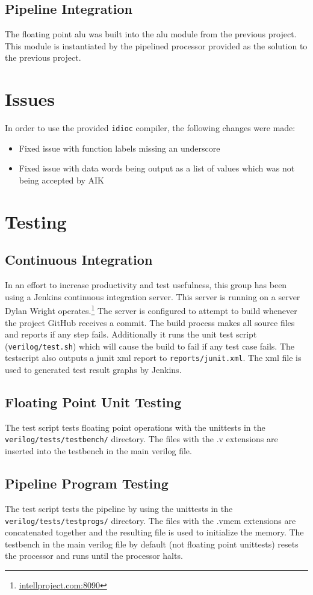 \documentclass[conference]{IEEEtran}
\begin{document}
\subsection{Pipeline Integration}
The floating point alu was built into the alu module from the previous project.
This module is instantiated by the pipelined processor provided as the 
solution to the previous project.\cite{a3-sol}

\section{Issues}
In order to use the provided \texttt{idioc} compiler, the following changes
were made:
\begin{itemize}
    \item Fixed issue with function labels missing an underscore
    \item Fixed issue with data words being output as a list of values which
        was not being accepted by AIK
\end{itemize}

\section{Testing}
\subsection{Continuous Integration}
In an effort to increase productivity and test usefulness, this group has
been using a Jenkins continuous integration server. This server is running
on a server Dylan Wright operates.\footnote{\url{intellproject.com:8090}} 
The server is configured to attempt to
build whenever the project GitHub receives a commit. The build process makes
all source files and reports if any step fails. Additionally it runs the
unit test script (\texttt{verilog/test.sh}) which will cause the build to fail
if any test case fails. The testscript also outputs a junit xml report to
\texttt{reports/junit.xml}. The xml file is used to generated test result
graphs by Jenkins. 

\subsection{Floating Point Unit Testing}
The test script tests floating point operations with the unittests in the
\texttt{verilog/tests/testbench/} directory. The files with the .v extensions
are inserted into the testbench in the main verilog file. 
\subsection{Pipeline Program Testing}
The test script tests the pipeline by using the unittests in the 
\texttt{verilog/tests/testprogs/} directory. The files with the .vmem 
extensions are concatenated together and the resulting file is used to 
initialize the memory. The testbench in the main verilog file by default (not
floating point unittests) resets the processor and runs until the processor
halts. 
\end{document}

